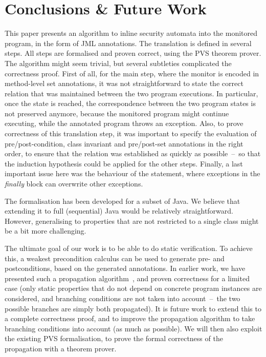 \section{Conclusions \& Future Work }\label{SecConcl}

This paper presents an algorithm to inline security automata into the
monitored program, in the form of JML annotations. The translation is
defined in several steps. All steps are formalised and proven correct,
using the PVS theorem prover. The algorithm might seem trivial, but
several subtleties complicated the correctness proof. First of all,
for the main step, where the monitor is encoded in method-level set
annotations, it was not straightforward to state the correct relation
that was maintained between the two program executions. In particular,
once the \halted state is reached, the correspondence between the two
program states is not preserved anymore, because the monitored program
might continue executing, while the annotated program throws an
exception. Also, to prove correctness of this translation step, it was
important to specify the evaluation of pre/post-condition, class
invariant and pre/post-set annotations in the right order, to ensure
that the relation was established as quickly as possible~--~so that
the induction hypothesis could be applied for the other
steps. Finally, a last important issue here was the behaviour of the
\TryCatch statement, where exceptions in the \emph{finally} block can
overwrite other exceptions.

The formalisation has been developed for a subset of Java. We believe
that extending it to full (sequential) Java would be relatively
straightforward. However, generalising to properties that are not
restricted to a single class might be a bit more challenging.

The ultimate goal of our work is to be able to do static
verification. To achieve this, a weakest precondition calculus can be
used to generate pre- and postconditions, based on the generated \Set
annotations. In earlier work, we have presented such a propagation
algorithm~\cite{PavlovaBBHL04}, and proven correctness for a limited
case (only static properties that do not depend on concrete program
instances are considered, and branching conditions are not taken into
account~--~the two possible branches are simply both propagated). It
is future work to extend this to a complete correctness proof, and to
improve the propagation algorithm to take branching conditions into
account (as much as possible). We will then also exploit the existing
PVS formalisation, to prove the formal correctness of the propagation
with a theorem prover.
